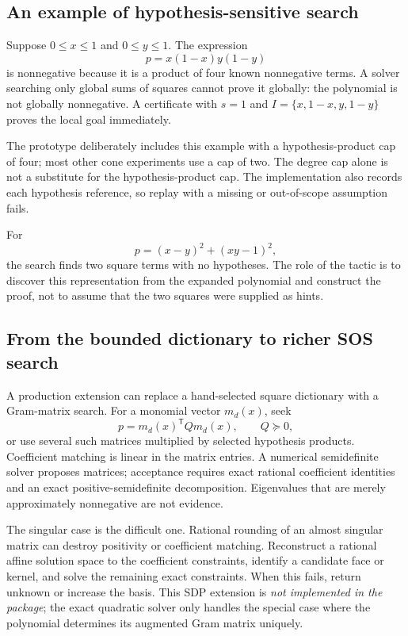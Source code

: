 \documentclass[11pt,letterpaper]{article}
\theoremstyle{definition}
\theoremstyle{remark}
\begin{document}
\subsection{An example of hypothesis-sensitive search}
Suppose $0\leq x\leq1$ and $0\leq y\leq1$. The expression
\[
p=x(1-x)y(1-y)
\]
is nonnegative because it is a product of four known nonnegative terms. A solver searching only global sums of squares cannot prove it globally: the polynomial is not globally nonnegative. A certificate with $s=1$ and $I=\{x,1-x,y,1-y\}$ proves the local goal immediately.

The prototype deliberately includes this example with a hypothesis-product cap of four; most other cone experiments use a cap of two. The degree cap alone is not a substitute for the hypothesis-product cap. The implementation also records each hypothesis reference, so replay with a missing or out-of-scope assumption fails.

For
\[
p=(x-y)^2+(xy-1)^2,
\]
the search finds two square terms with no hypotheses. The role of the tactic is to discover this representation from the expanded polynomial and construct the proof, not to assume that the two squares were supplied as hints.

\subsection{From the bounded dictionary to richer SOS search}
A production extension can replace a hand-selected square dictionary with a Gram-matrix search. For a monomial vector $m_d(x)$, seek
\[
p=m_d(x)^\mathsf{T}Qm_d(x),\qquad Q\succeq0,
\]
or use several such matrices multiplied by selected hypothesis products. Coefficient matching is linear in the matrix entries. A numerical semidefinite solver proposes matrices; acceptance requires exact rational coefficient identities and an exact positive-semidefinite decomposition. Eigenvalues that are merely approximately nonnegative are not evidence.

The singular case is the difficult one. Rational rounding of an almost singular matrix can destroy positivity or coefficient matching. Reconstruct a rational affine solution space to the coefficient constraints, identify a candidate face or kernel, and solve the remaining exact constraints. When this fails, return unknown or increase the basis. This SDP extension is \emph{not implemented in the package}; the exact quadratic solver only handles the special case where the polynomial determines its augmented Gram matrix uniquely.
\end{document}
